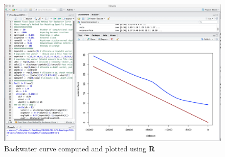 \begin{figure}[h!] %
   \centering
   \includegraphics[width=5.6in]{ExamplePlot.jpg} 
   \caption{Backwater curve computed and plotted using \textbf{R}}
   \label{fig:ExamplePlot}
\end{figure}
\clearpage
